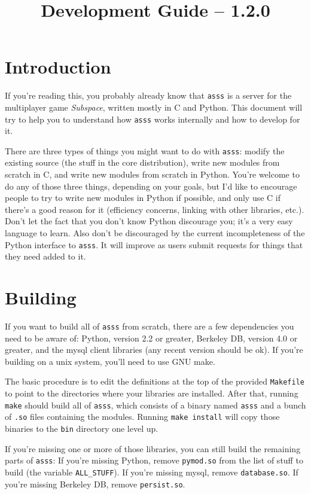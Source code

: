 \documentclass{article}
\title{\asss{} Development Guide -- 1.2.0}
\newcommand{\asss}{\texttt{asss}}
\begin{document}
\maketitle

\section{Introduction}

If you're reading this, you probably already know that \asss{} is a
server for the multiplayer game \emph{Subspace}, written mostly in C and
Python. This document will try to help you to understand how \asss{}
works internally and how to develop for it.

There are three types of things you might want to do with \asss{}:
modify the existing source (the stuff in the core distribution), write
new modules from scratch in C, and write new modules from scratch in
Python. You're welcome to do any of those three things, depending on
your goals, but I'd like to encourage people to try to write new modules
in Python if possible, and only use C if there's a good reason for it
(efficiency concerns, linking with other libraries, etc.). Don't let the
fact that you don't know Python discourage you; it's a very easy
language to learn. Also don't be discouraged by the current
incompleteness of the Python interface to \asss{}. It will improve as
users submit requests for things that they need added to it.


\section{Building}

If you want to build all of \asss{} from scratch, there are a few
dependencies you need to be aware of: Python, version 2.2 or greater,
Berkeley DB, version 4.0 or greater, and the mysql client libraries (any
recent version should be ok). If you're building on a unix system,
you'll need to use GNU make.

The basic procedure is to edit the definitions at the top of the
provided \verb/Makefile/ to point to the directories where your
libraries are installed. After that, running \verb/make/ should build
all of \asss{}, which consists of a binary named \verb/asss/ and a bunch
of \verb/.so/ files containing the modules. Running \verb/make install/
will copy those binaries to the \verb/bin/ directory one level up.

If you're missing one or more of those libraries, you can still build
the remaining parts of \asss{}: If you're missing Python, remove
\verb/pymod.so/ from the list of stuff to build (the variable
\verb/ALL_STUFF/). If you're missing mysql, remove \verb/database.so/.
If you're missing Berkeley DB, remove \verb/persist.so/.
\end{document}
